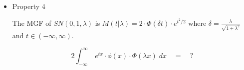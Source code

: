 \message{ !name(properties.tex)}\documentclass{article}
\begin{document}
\begin{itemize}
\item Property 4
  \begin{thm*}
    The MGF of $SN(0, 1, \lambda)$ is $M(t|\lambda) = 2 \cdot \Phi (\delta t) \cdot e^{t^2/2}$ where
    $\delta = \frac{\lambda}{\sqrt{1 + \lambda^2}}$ and $t \in (-\infty, \infty)$.
  \end{thm*}

  \[
  2 \int_{-\infty}^\infty \; e^{tx} \cdot \phi (x) \cdot \Phi (\lambda x) \; dx \quad = \quad ?
  \]

\end{itemize}
\end{document}
